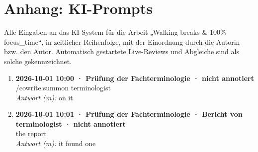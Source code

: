 \section*{Anhang: KI-Prompts}

Alle Eingaben an das KI-System für die Arbeit „Walking breaks \& 100\% focus\_time“, in zeitlicher Reihenfolge, mit der Einordnung durch die Autorin bzw. den Autor. Automatisch gestartete Live-Reviews und Abgleiche sind als solche gekennzeichnet.

\begin{enumerate}
  \item \textbf{2026-10-01 10:00 · Prüfung der Fachterminologie · nicht annotiert} \\
  /cowrite:summon terminologist
  \\ \textit{Antwort (m):} on it
  \item \textbf{2026-10-01 10:01 · Prüfung der Fachterminologie · Bericht von terminologist · nicht annotiert} \\
  the report
  \\ \textit{Antwort (m):} it found one
\end{enumerate}
